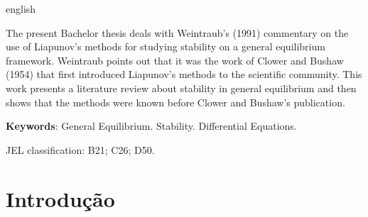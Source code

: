 \documentclass[
	12pt,				%
	openright,			%
	twoside,			%
	a4paper,			%
	english,			%
	french,				%
	spanish,			%
	brazil				%
	]{abntex2}
\begin{document}
\begin{resumo}[Abstract]
 \begin{otherlanguage*}{english}

The present Bachelor thesis deals with Weintraub's (1991) commentary on the use of
Liapunov's methods for studying stability on a general equilibrium framework.
Weintraub points out that it was the work of Clower and Bushaw (1954) that
first introduced Liapunov's methods to the scientific community. This work
presents a literature review about stability in general equilibrium and then
shows that the methods were known before Clower and Bushaw's publication.

   \textbf{Keywords}: General Equilibrium. Stability. Differential Equations.

	 JEL classification: B21; C26; D50.
 \end{otherlanguage*}
\end{resumo}





\tableofcontents*
\cleardoublepage



\textual

\chapter*[Introdução]{Introdução}
\end{document}
